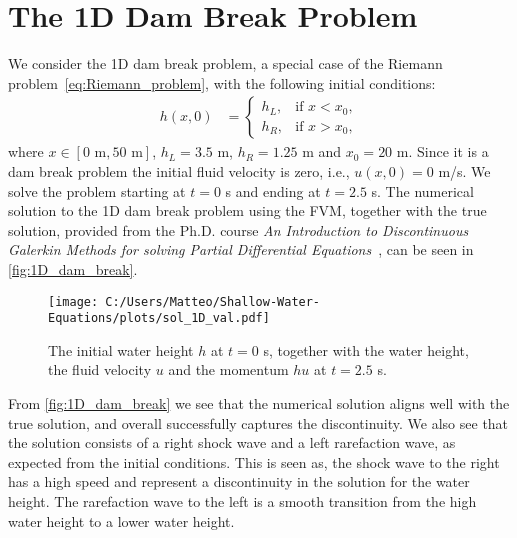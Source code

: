 \section{The 1D Dam Break Problem}\label{sec:1D_dam_break}
We consider the 1D dam break problem, a special case of the Riemann problem~\eqref{eq:Riemann_problem}, with the following initial conditions:
\begin{align*}
    h(x,0) &= \begin{cases}
        h_L, & \text{if } x < x_0, \\
        h_R, & \text{if } x > x_0,
    \end{cases} 
\end{align*}
where $x \in [0 \text{ m}, 50 \text{ m}]$, $h_L = 3.5$ m, $h_R = 1.25$ m and $x_0 = 20$ m.
Since it is a dam break problem the initial fluid velocity is zero, i.e., $u(x,0) = 0$ m/s.
We solve the problem starting at $t=0$ s and ending at $t=2.5$ s.
The numerical solution to the 1D dam break problem using the FVM, together with the true solution, provided from the Ph.D. course \textit{An Introduction to Discontinuous Galerkin Methods for solving Partial Differential Equations}~\cite{phd_corse_2009}, can be seen in \autoref{fig:1D_dam_break}.
\begin{figure}[H]
    \centering
    \texttt{[image: C:/Users/Matteo/Shallow-Water-Equations/plots/sol\_1D\_val.pdf]}
    \caption{The initial water height $h$ at $t=0$ s, together with the water height, the fluid velocity $u$ and the momentum $hu$ at $t=2.5$ s.}\label{fig:1D_dam_break}
\end{figure}
From \autoref{fig:1D_dam_break} we see that the numerical solution aligns well with the true solution, and overall successfully captures the discontinuity.
We also see that the solution consists of a right shock wave and a left rarefaction wave, as expected from the initial conditions.
This is seen as, the shock wave to the right has a high speed and represent a discontinuity in the solution for the water height.
The rarefaction wave to the left is a smooth transition from the high water height to a lower water height.

